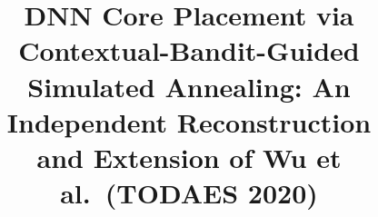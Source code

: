 \documentclass[10pt,conference]{IEEEtran}
\begin{document}

\title{DNN Core Placement via Contextual-Bandit-Guided\\
       Simulated Annealing: An Independent Reconstruction\\
       and Extension of Wu et al.\ (TODAES 2020)}

\author{
}

\maketitle
\end{document}
